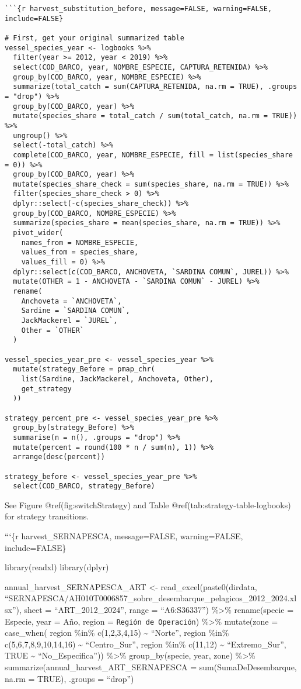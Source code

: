 \begin{verbatim}
```{r harvest_substitution_before, message=FALSE, warning=FALSE, include=FALSE}

# First, get your original summarized table
vessel_species_year <- logbooks %>% 
  filter(year >= 2012, year < 2019) %>% 
  select(COD_BARCO, year, NOMBRE_ESPECIE, CAPTURA_RETENIDA) %>%
  group_by(COD_BARCO, year, NOMBRE_ESPECIE) %>%
  summarize(total_catch = sum(CAPTURA_RETENIDA, na.rm = TRUE), .groups = "drop") %>%
  group_by(COD_BARCO, year) %>%
  mutate(species_share = total_catch / sum(total_catch, na.rm = TRUE)) %>%
  ungroup() %>%
  select(-total_catch) %>%
  complete(COD_BARCO, year, NOMBRE_ESPECIE, fill = list(species_share = 0)) %>%
  group_by(COD_BARCO, year) %>%
  mutate(species_share_check = sum(species_share, na.rm = TRUE)) %>%
  filter(species_share_check > 0) %>%
  dplyr::select(-c(species_share_check)) %>%
  group_by(COD_BARCO, NOMBRE_ESPECIE) %>% 
  summarize(species_share = mean(species_share, na.rm = TRUE)) %>%
  pivot_wider(
    names_from = NOMBRE_ESPECIE,
    values_from = species_share,
    values_fill = 0) %>%
  dplyr::select(c(COD_BARCO, ANCHOVETA, `SARDINA COMUN`, JUREL)) %>%
  mutate(OTHER = 1 - ANCHOVETA - `SARDINA COMUN` - JUREL) %>%
  rename(
    Anchoveta = `ANCHOVETA`,
    Sardine = `SARDINA COMUN`,
    JackMackerel = `JUREL`,
    Other = `OTHER`
  )

vessel_species_year_pre <- vessel_species_year %>%
  mutate(strategy_Before = pmap_chr(
    list(Sardine, JackMackerel, Anchoveta, Other),
    get_strategy
  ))

strategy_percent_pre <- vessel_species_year_pre %>%
  group_by(strategy_Before) %>%
  summarise(n = n(), .groups = "drop") %>%
  mutate(percent = round(100 * n / sum(n), 1)) %>%
  arrange(desc(percent)) 

strategy_before <- vessel_species_year_pre %>%
  select(COD_BARCO, strategy_Before)
\end{verbatim}

See Figure @ref(fig:switchStrategy) and Table
@ref(tab:strategy-table-logbooks) for strategy transitions.

```\{r harvest\_SERNAPESCA, message=FALSE, warning=FALSE,
include=FALSE\}

library(readxl) library(dplyr)

annual\_harvest\_SERNAPESCA\_ART \textless- read\_excel(paste0(dirdata,
``SERNAPESCA/AH010T0006857\_sobre\_desembarque\_pelagicos\_2012\_2024.xlsx''),
sheet = ``ART\_2012\_2024'', range = ``A6:S36337'') \%\textgreater\%
rename(specie = Especie, year = Año, region =
\texttt{Región\ de\ Operación}) \%\textgreater\% mutate(zone =
case\_when( region \%in\% c(1,2,3,4,15) \textasciitilde{} ``Norte'',
region \%in\% c(5,6,7,8,9,10,14,16) \textasciitilde{} ``Centro\_Sur'',
region \%in\% c(11,12) \textasciitilde{} ``Extremo\_Sur'', TRUE
\textasciitilde{} ``No\_Especifica'')) \%\textgreater\%
group\_by(specie, year, zone) \%\textgreater\%
summarize(annual\_harvest\_ART\_SERNAPESCA = sum(SumaDeDesembarque,
na.rm = TRUE), .groups = ``drop'')

